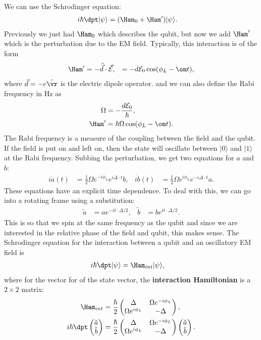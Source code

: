 \documentclass[lasers.tex]{subfiles}
\begin{document}
We can use the Schrodinger equation:
\begin{align}
    i\hbar\dpt|\psi\rangle &= (\Ham_0+\Ham')|\psi\rangle.
\end{align}
Previously we just had $\Ham_0$ which describes the qubit, but now we add $\Ham'$ which is the perturbation due to the EM field.
Typically, this interaction is of the form 
\begin{align}
    \Ham' &= -\hat{\vec{d}}\cdot\vec{\mathcal{E}},
          &= -d\mathcal{E}_0\cos(\phi_L-\om t),
\end{align}
where $\vec{d}=-e\hat{\vr}$ is the electric dipole operator.
and we can also define the Rabi frequency in Hz as
\begin{align}
    \Omega &= -\frac{d\mathcal{E}_0}{\hbar}, \\
    \Ham' &= \hbar\Omega\cos(\phi_L-\om t).
\end{align}
The Rabi frequency is a measure of the coupling between the field and the qubit. 
If the field is put on and left on, then the state will oscillate between $|0\rangle$ and $|1\rangle$ at the Rabi frequency. 
Subbing the perturbation, we get two equations for $a$ and $b$:
\begin{align}
    i\dot{a}(t) &= \frac12\Omega e^{-i\phi_L}e^{i\Delta\cdot t}b, & i\dot{b}(t) &= \frac12\Omega e^{i\phi_L}e^{-i\Delta\cdot t}a.
\end{align}
These equations have an explicit time dependence.
To deal with this, we can go into a rotating frame using a substitution:
\begin{align}
    \tilde{a} &= ae^{-it\cdot\Delta/2}, & \tilde{b} &= be^{it\cdot\Delta/2}.
\end{align}
This is so that we spin at the same frequency as the qubit and since we are interested in the relative phase of the field and qubit, this makes sense. 
The Schrodinger equation for the interaction between a qubit and an oscillatory EM field is
\begin{align}
    i\hbar\dpt|\psi\rangle &= \Ham_{int}|\psi\rangle,
\end{align}
where for the vector for of the state vector, the \textbf{interaction Hamiltonian} is a $2\times2$ matrix:
\begin{align}
    \Ham_{int} &= \frac{\hbar}{2}\begin{pmatrix} \Delta & \Omega e^{-i\phi_L} \\ \Omega e^{i\phi_L} & -\Delta\end{pmatrix}, \\
    i\hbar\dpt \begin{pmatrix}\tilde{a}\\ \tilde{b}\end{pmatrix} &= \frac{\hbar}{2}\begin{pmatrix}\Delta & \Omega e^{-i\phi_L} \\ \Omega e^{i\phi_L} & -\Delta\end{pmatrix}\begin{pmatrix}\tilde{a}\\ \tilde{b}\end{pmatrix}.
\end{align}
\end{document}
